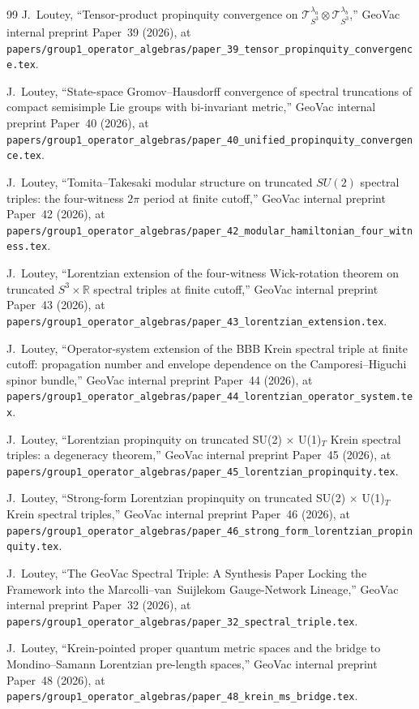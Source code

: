 \documentclass[11pt,a4paper]{article}
\theoremstyle{plain}
\theoremstyle{definition}
\newcommand{\Tcal}{\mathcal{T}}
\begin{document}
\begin{thebibliography}{99}
J.~Loutey, ``Tensor-product propinquity convergence on
$\Tcal_{S^{3}}^{\lambda_{a}}\otimes\Tcal_{S^{3}}^{\lambda_{b}}$,''
GeoVac internal preprint Paper~39 (2026), at
\texttt{papers/group1\_operator\_algebras/paper\_39\_tensor\_propinquity\_convergence.tex}.

J.~Loutey, ``State-space Gromov--Hausdorff convergence of spectral
truncations of compact semisimple Lie groups with bi-invariant metric,'' GeoVac
internal preprint Paper~40 (2026), at
\texttt{papers/group1\_operator\_algebras/paper\_40\_unified\_propinquity\_convergence.tex}.

J.~Loutey, ``Tomita--Takesaki modular structure on truncated $SU(2)$
spectral triples: the four-witness $2\pi$ period
at finite cutoff,'' GeoVac internal preprint Paper~42 (2026), at
\texttt{papers/group1\_operator\_algebras/paper\_42\_modular\_hamiltonian\_four\_witness.tex}.

J.~Loutey, ``Lorentzian extension of the four-witness Wick-rotation
theorem on truncated $S^3 \times \mathbb{R}$ spectral triples at finite
cutoff,'' GeoVac internal preprint
Paper~43 (2026), at
\texttt{papers/group1\_operator\_algebras/paper\_43\_lorentzian\_extension.tex}.

J.~Loutey, ``Operator-system extension of the BBB Krein spectral
triple at finite cutoff: propagation number and envelope dependence
on the Camporesi--Higuchi spinor bundle,'' GeoVac internal preprint Paper~44 (2026),
at
\texttt{papers/group1\_operator\_algebras/paper\_44\_lorentzian\_operator\_system.tex}.

J.~Loutey, ``Lorentzian propinquity on truncated SU(2)
$\times$ U(1)$_{T}$ Krein spectral triples: a degeneracy theorem,'' GeoVac internal
preprint Paper~45 (2026), at
\texttt{papers/group1\_operator\_algebras/paper\_45\_lorentzian\_propinquity.tex}.

J.~Loutey, ``Strong-form Lorentzian propinquity on
truncated SU(2) $\times$ U(1)$_{T}$ Krein spectral triples,''
GeoVac internal preprint Paper~46 (2026), at
\texttt{papers/group1\_operator\_algebras/paper\_46\_strong\_form\_lorentzian\_propinquity.tex}.

J.~Loutey, ``The GeoVac Spectral Triple: A Synthesis Paper Locking the
Framework into the Marcolli--van~Suijlekom Gauge-Network Lineage,''
GeoVac internal preprint Paper~32 (2026), at
\texttt{papers/group1\_operator\_algebras/paper\_32\_spectral\_triple.tex}.

J.~Loutey, ``Krein-pointed proper quantum metric spaces and the bridge
to Mondino--Samann Lorentzian pre-length spaces,''
GeoVac internal preprint Paper~48 (2026), at
\texttt{papers/group1\_operator\_algebras/paper\_48\_krein\_ms\_bridge.tex}.

\end{thebibliography}
\end{document}
